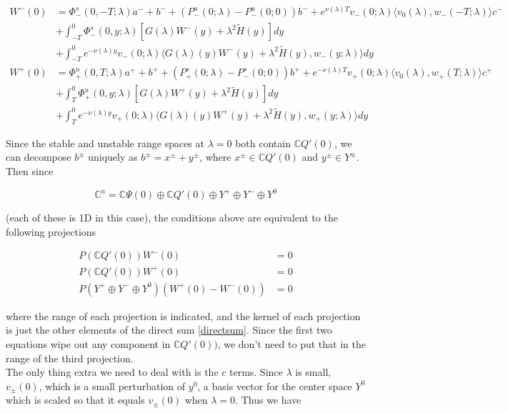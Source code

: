 \documentclass[12pt]{article}
\def\C{{\mathbb C}}
\begin{document}
\begin{enumerate}
\begin{align*}
W^-(0) &= \Phi^s_-(0, -T; \lambda )a^- + b^- + (P^u_-(0; \lambda) - P^u_-(0; 0))b^- + e^{\nu(\lambda)T} v_-(0; \lambda) \langle v_0(\lambda), w_-(-T; \lambda) \rangle c^- \\
&+ \int_{-T}^0 \Phi^s_-(0, y; \lambda) [ G(\lambda)W^-(y) + \lambda^2 \tilde{H}(y) ] dy \\
&+ \int_{-T}^0 
e^{-\nu(\lambda)y} v_-(0; \lambda) \langle G(\lambda)(y)W^-(y) + \lambda^2 \tilde{H}(y), w_-(y; \lambda) \rangle dy \\
W^+(0) &= \Phi^u_+(0, T; \lambda)a^+ + b^+ + (P^s_+(0; \lambda) - P^s_-(0; 0))b^+ + e^{-\nu(\lambda)T} v_+(0; \lambda) \langle v_0(\lambda), w_+(T; \lambda) \rangle c^+ \\
&+ \int_T^0 \Phi^u_+(0, y; \lambda) [ G(\lambda)W^+(y) + \lambda^2 \tilde{H}(y) ] dy \\
&+ \int_T^0 e^{-\nu(\lambda)y} v_+(0; \lambda) \langle G(\lambda)(y)W^+(y) + \lambda^2 \tilde{H}(y), w_+(y; \lambda) \rangle dy
\end{align*}

Since the stable and unstable range spaces at $\lambda = 0$ both contain $\C Q'(0)$, we can decompose $b^\pm$ uniquely as $b^\pm = x^\pm + y^\pm$, where $x^\pm \in \C Q'(0)$ and $y^\pm \in Y^\pm$. Then since

\begin{equation}\label{directsum}
\C^n = \C\Psi(0) \oplus \C Q'(0) \oplus Y^+ \oplus Y^- \oplus Y^0
\end{equation}

(each of these is 1D in this case), the conditions above are equivalent to the following projections

\begin{align*}
P(\C Q'(0))W^-(0) &= 0 \\
P(\C Q'(0))W^+(0) &= 0 \\
P(Y^+ \oplus Y^- \oplus Y^0) (W^+(0) - W^-(0) ) &= 0
\end{align*}

where the range of each projection is indicated, and the kernel of each projection is just the other elements of the direct sum \eqref{directsum}. Since the first two equations wipe out any component in $\C Q'(0))$, we don't need to put that in the range of the third projection. \\

The only thing extra we need to deal with is the $c$ terms. Since $\lambda$ is small, $v_\pm(0)$, which is a small perturbation of $y^0$, a basis vector for the center space $Y^0$ which is scaled so that it equals $v_\pm(0)$ when $\lambda = 0$. Thus we have


\end{enumerate}
\end{document}
